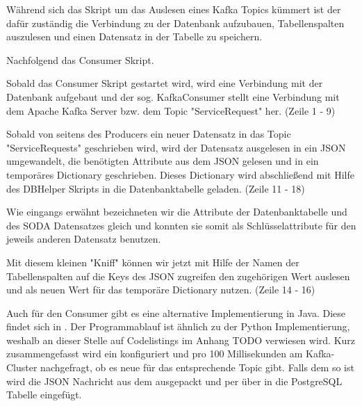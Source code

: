 Während sich das  Skript um das Auslesen eines Kafka Topics kümmert ist der 
dafür zuständig die Verbindung zu der Datenbank aufzubauen, Tabellenspalten auszulesen und einen Datensatz in der Tabelle zu speichern.

Nachfolgend das Consumer Skript.



Sobald das Consumer Skript gestartet wird, wird eine Verbindung mit der Datenbank
aufgebaut und der sog. KafkaConsumer stellt eine Verbindung mit dem Apache Kafka
Server bzw. dem Topic "ServiceRequest" her.
(Zeile 1 - 9)

Sobald von seitens des Producers ein neuer Datensatz in das Topic "ServiceRequests" geschrieben wird,
wird der Datensatz ausgelesen in ein \ac{JSON} umgewandelt, die benötigten Attribute aus dem \ac{JSON} gelesen
und in ein temporäres Dictionary geschrieben.
Dieses Dictionary wird abschließend mit Hilfe des DBHelper Skripts in die
Datenbanktabelle geladen.
(Zeile 11 - 18)

Wie eingangs erwähnt bezeichneten wir die Attribute der Datenbanktabelle und des \ac{SODA} Datensatzes gleich
und konnten sie somit als Schlüsselattribute für den jeweils anderen Datensatz benutzen.

Mit diesem kleinen "Kniff" können wir jetzt mit Hilfe der Namen der Tabellenspalten
auf die Keys des \ac{JSON} zugreifen den zugehörigen Wert auslesen und als neuen Wert für das temporäre Dictionary nutzen.
(Zeile 14 - 16)

Auch für den Consumer gibt es eine alternative Implementierung in Java. Diese findet sich in . Der Programmablauf ist ähnlich zu der Python Implementierung, weshalb an dieser Stelle auf Codelistings im Anhang TODO verwiesen wird. Kurz zusammengefasst wird ein  konfiguriert und pro 100 Millisekunden am Kafka-Cluster nachgefragt, ob es neue  für das entsprechende Topic gibt. Falls dem so ist wird die \ac{JSON} Nachricht aus dem  ausgepackt und per  über  in die PostgreSQL Tabelle eingefügt.